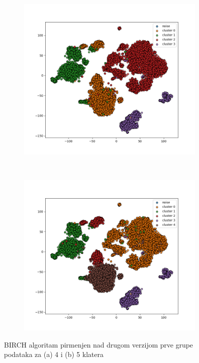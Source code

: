 \documentclass[a4paper]{article}
\begin{document}
\begin{figure}[H]
	\centering
	\begin{subfigure}[normla]{0.5\textwidth}
		\includegraphics[scale=0.3]{birch_cluster4_v2}
		\caption{}
		\label{spektral_nmf_grp1_euklidsko_A}
	\end{subfigure}
	~
	\begin{subfigure}[normla]{0.4\textwidth}
		\includegraphics[scale=0.3]{birch_cluster5_v2}
		\caption{}
		\label{spektral_nmf_grp1_euklidsko_B}
	\end{subfigure}
	\caption{BIRCH algoritam pirmenjen nad drugom verzijom prve grupe podataka za (a) 4 i (b) 5 klatera}
\label{spektral_nmf_grp1_euklidsko}
\end{figure}
\end{document}
